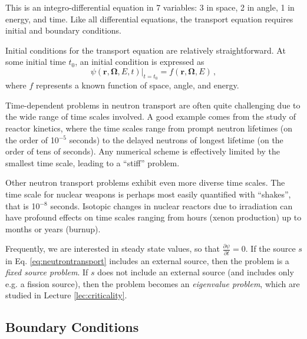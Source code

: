 This is an integro-differential equation in 7 variables: 3 in space, 2 in angle, 1 in energy, and time.  Like all differential equations, the transport equation requires initial and boundary conditions. 


Initial conditions for the transport equation are relatively straightforward.  At some initial time $t_0$, an initial condition is expressed as
\begin{equation}
 \psi(\mathbf{r},\mathbf{\Omega},E,t)|_{t=t_0} = f(\mathbf{r},\mathbf{\Omega},E) \, ,
\end{equation}
where $f$ represents a known function of space, angle, and energy.  

Time-dependent problems in neutron transport are often quite challenging due to the wide range of time scales involved.  A good example comes from the study of reactor kinetics, where the time scales range from prompt neutron lifetimes (on the order of 10$^{-5}$ seconds) to the delayed neutrons of longest lifetime (on the order of tens of seconds).  Any numerical scheme is effectively limited by the smallest time scale, leading to a ``stiff'' problem.  

Other neutron transport problems exhibit even more diverse time scales.  The time scale for nuclear weapons is perhaps most easily quantified with ``shakes'', that is 10$^{-8}$ seconds.  Isotopic changes in nuclear reactors due to irradiation can have profound effects on time scales ranging from hours (xenon production) up to months or years (burnup).

Frequently, we are interested in steady state values, so that $\frac{\partial \psi}{\partial t} = 0$.  If the source $s$ in Eq. \ref{eq:neutrontransport} includes an external source, then the problem is a \textit{fixed source problem}.  If $s$ does not include an external source (and includes only e.g. a fission source), then the problem becomes an \textit{eigenvalue problem}, which are studied in Lecture \ref{lec:criticality}.

\subsection*{Boundary Conditions}

